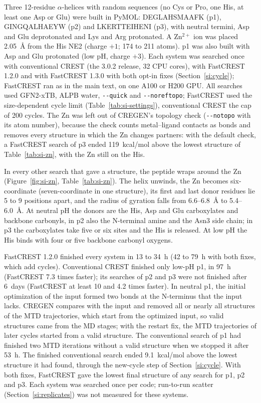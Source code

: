 \documentclass[journal=jctcce,manuscript=suppinfo]{achemso}
\newcommand{\quickflag}{\texttt{-{}-quick}}
\begin{document}
Three 12-residue $\alpha$-helices with random sequences (no Cys or Pro, one His, at least one Asp or Glu) were built in
PyMOL: \mbox{DEGLAHSMAAFK} (p1), \mbox{GINGQALHAEYW} (p2) and \mbox{LKERTTEIHENI} (p3), with neutral termini, Asp and Glu deprotonated and
Lys and Arg protonated. A Zn$^{2+}$ ion was placed 2.05~\AA{} from the His NE2 (charge $+1$; 174 to 211 atoms). p1 was
also built with Asp and Glu protonated (low pH, charge $+3$). Each system was searched once with conventional CREST (the
3.0.2 release, 32 CPU cores), with FastCREST 1.2.0 and with FastCREST 1.3.0 with both opt-in fixes
(Section~\ref{si:cycle}); FastCREST ran as in the main text, on one A100 or H200 GPU. All searches used GFN2-xTB, ALPB
water, \quickflag{} and \texttt{-{}-noreftopo}; FastCREST used the size-dependent cycle limit
(Table~\ref{tab:si-settings}), conventional CREST the cap of 200 cycles. The Zn was left out of CREGEN's topology check
(\texttt{-{}-notopo} with its atom number), because the check counts metal--ligand contacts as bonds and removes every structure in which the Zn
changes partners: with the default check, a FastCREST search of p3 ended 119~kcal/mol above the lowest structure of
Table~\ref{tab:si-zn}, with the Zn still on the His.

In every other search that gave a structure, the peptide wraps around the Zn (Figure~\ref{fig:si-zn},
Table~\ref{tab:si-zn}). The helix unwinds, the Zn becomes six-coordinate (seven-coordinate in one structure), its first
and last donor residues lie 5 to 9 positions apart, and the radius of gyration falls from 6.6--6.8~\AA{} to
5.4--6.0~\AA. At neutral pH the donors are the His, Asp and Glu carboxylates and backbone carbonyls, in p2 also the
N-terminal amine and the Asn3 side chain; in p3 the carboxylates take five or six sites and the His is released. At low
pH the His binds with four or five backbone carbonyl oxygens.

FastCREST 1.2.0 finished every system in 13 to 34~h (42 to 79~h with both fixes, which add cycles). Conventional CREST
finished only low-pH p1, in 97~h (FastCREST 7.3 times faster); its searches of p2 and p3 were not finished after 6~days
(FastCREST at least 10 and 4.2 times faster). In neutral p1, the initial optimization of the input formed two bonds at the N-terminus that the input lacks. CREGEN compares with the input and removed all or nearly all structures of the MTD trajectories, which start from the optimized input, so valid structures came from the MD stages; with the restart fix, the MTD trajectories of
later cycles started from a valid structure. The conventional search of p1 had finished two MTD iterations without a valid
structure when we stopped it after 53~h. The finished conventional search ended 9.1~kcal/mol above the lowest structure
it had found, through the new-cycle step of Section~\ref{si:cycle}. With both fixes, FastCREST gave the lowest final
structure of any search for p1, p2 and p3. Each system was searched once per code; run-to-run scatter
(Section~\ref{si:replicates}) was not measured for these systems.
\end{document}
